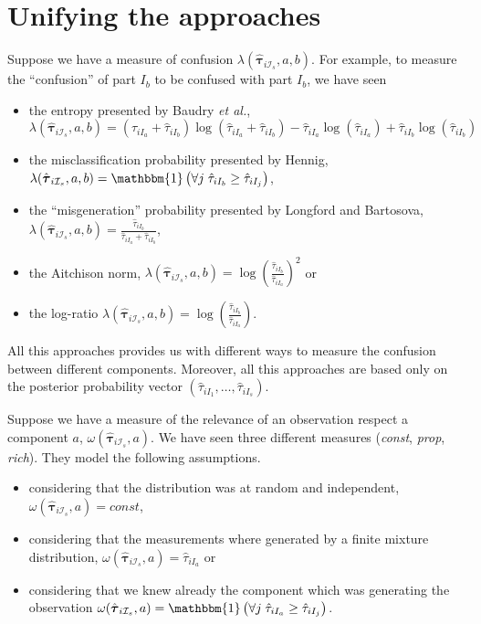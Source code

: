 \documentclass[10pt, a4paper]{article}
\newcommand{\m}[1]{\boldsymbol{#1}}
\begin{document}

\section{Unifying the approaches}
\label{confusion}

Suppose we have a measure of confusion $\lambda(\hat{\m \tau}_{i \mathcal{I}_s}, a, b)$. For example, to measure the ``confusion'' of part $I_b$ to be confused with part $I_b$, we have seen 
\begin{itemize}
\item the entropy presented by Baudry \emph{et al.}, $\lambda(\hat{\m \tau}_{i \mathcal{I}_s}, a, b) = (\hat{\tau}_{iI_a}+\hat{\tau}_{iI_b}) \log(\hat{\tau}_{iI_a} + \hat{\tau}_{iI_b}) - \hat{\tau}_{iI_a} \log(\hat{\tau}_{iI_a}) + \hat{\tau}_{iI_b} \log(\hat{\tau}_{iI_b})$
\item the misclassification probability presented by Hennig, $\lambda(\hat{\m \tau}_{i \mathcal{I}_s}, a, b) = \mathbbm{1}\left( \forall j\; \hat{\tau}_{i I_{b}} \geq \hat{\tau}_{iI_j} \right)$,
\item the ``misgeneration'' probability presented by Longford and Bartosova, $\lambda(\hat{\m \tau}_{i \mathcal{I}_s}, a, b) = \frac{\hat{\tau}_{iI_b}}{\hat{\tau}_{iI_a} + \hat{\tau}_{iI_b}}$,
\item the Aitchison norm, $\lambda(\hat{\m \tau}_{i \mathcal{I}_s}, a, b) = \log (\frac{ \hat{\tau}_{iI_b} }{ \hat{\tau}_{iI_a} })^2$ or
\item the log-ratio $\lambda(\hat{\m \tau}_{i \mathcal{I}_s}, a, b) = \log (\frac{ \hat{\tau}_{iI_b} }{ \hat{\tau}_{iI_a} })$.
\end{itemize}



All this approaches provides us with different ways to measure the confusion between different components. Moreover, all this approaches are based only on the posterior probability 
vector $(\hat{\tau}_{i I_{1}}, \dots, \hat{\tau}_{i I_{s}})$. 


Suppose we have a measure of the relevance of an observation respect a component $a$, $\omega(\hat{\m \tau}_{i \mathcal{I}_s}, a)$. We have seen three different measures  (\emph{const}, \emph{prop}, \emph{rich}). They model the following assumptions.

\begin{itemize}
\item considering that the distribution was at random and independent, $\omega(\hat{\m \tau}_{i \mathcal{I}_s}, a) = const$,
\item considering that the measurements where generated by a finite mixture distribution, $\omega(\hat{\m \tau}_{i \mathcal{I}_s}, a) =  \hat{\tau}_{iI_a}$ or
\item considering that we knew already the component which was generating the observation $\omega(\hat{\m \tau}_{i \mathcal{I}_s}, a) = \mathbbm{1}\left( \forall j\; \hat{\tau}_{i I_{a}} \geq \hat{\tau}_{iI_j} \right)$.
\end{itemize}
\end{document}

